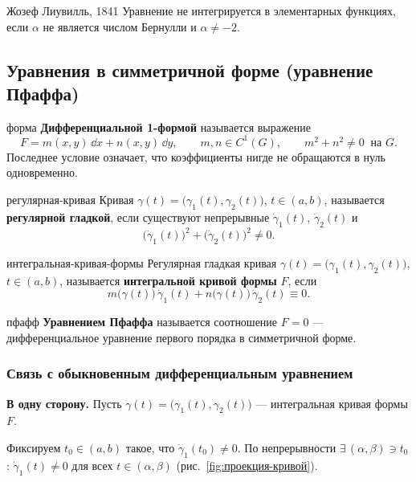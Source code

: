 \begin{Remark}{Жозеф Лиувилль, 1841}{}
	Уравнение не интегрируется в элементарных функциях, если $\alpha$ не
	является числом Бернулли и $\alpha \neq -2$.
\end{Remark}

\subsection{Уравнения в симметричной форме (уравнение Пфаффа)}

\begin{Definition}{}{форма}
	\textbf{Дифференциальной 1-формой} называется выражение
	\[
	F = m(x,y)\,\dd x + n(x,y)\,\dd y, \qquad m,n \in C^1(G),
	\qquad m^2 + n^2 \neq 0 \ \text{ на } G.
	\]
	Последнее условие означает, что коэффициенты нигде не обращаются в нуль
	одновременно.
\end{Definition}

\begin{Definition}{}{регулярная-кривая}
	Кривая $\gamma(t) = \bigl(\gamma_1(t), \gamma_2(t)\bigr)$, $t \in (a,b)$,
	называется \textbf{регулярной гладкой}, если существуют непрерывные
	$\dot\gamma_1(t)$, $\dot\gamma_2(t)$ и
	\[
	\bigl(\dot\gamma_1(t)\bigr)^2 + \bigl(\dot\gamma_2(t)\bigr)^2 \neq 0.
	\]
\end{Definition}

\begin{Definition}{}{интегральная-кривая-формы}
	Регулярная гладкая кривая
	$\gamma(t) = \bigl(\gamma_1(t), \gamma_2(t)\bigr)$, $t \in (a,b)$,
	называется \textbf{интегральной кривой формы} $F$, если
	\[
	m\bigl(\gamma(t)\bigr)\,\dot\gamma_1(t)
	+ n\bigl(\gamma(t)\bigr)\,\dot\gamma_2(t) \equiv 0.
	\]
\end{Definition}

\begin{Definition}{}{пфафф}
	\textbf{Уравнением Пфаффа} называется соотношение $F = 0$ ---
	дифференциальное уравнение первого порядка в симметричной форме.
\end{Definition}

\subsubsection*{Связь с обыкновенным дифференциальным уравнением}

\textbf{В одну сторону.} Пусть
$\gamma(t) = \bigl(\gamma_1(t),\gamma_2(t)\bigr)$ --- интегральная кривая
формы $F$.

Фиксируем $t_0 \in (a,b)$ такое, что $\dot\gamma_1(t_0) \neq 0$. По
непрерывности $\exists\,(\alpha,\beta) \ni t_0$: $\dot\gamma_1(t) \neq 0$
для всех $t \in (\alpha,\beta)$ (рис.~\ref{fig:проекция-кривой}).

